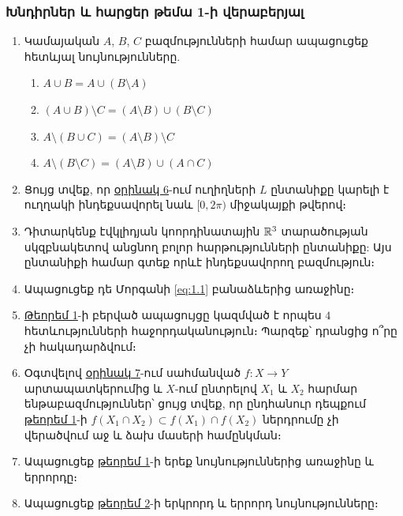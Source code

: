 \bigskip
\bigskip
\subsubsection*{Խնդիրներ և հարցեր թեմա 1-ի վերաբերյալ}

\begin{enumerate}[label=\thesection.\arabic*.]
\item  Կամայական $A$, $B$, $C$ բազմությունների համար ապացուցեք հետևյալ նույ\-նու\-թյուն\-ները.
\begin{enumerate}
    \item[ա)] $A \cup B = A \cup (B \setminus A)$
    \item[բ)] $(A \cup B) \setminus C = (A \setminus B)\cup(B \setminus C)$
    \item[գ)] $A \setminus(B \cup C)  = (A \setminus B) \setminus C$
    \item[դ)] $A \setminus (B \setminus C) = (A \setminus B) \cup (A \cap C)$
\end{enumerate}

\item  Ցույց տվեք, որ \hyperref[ch1ex6]{օրինակ 6}-ում ուղիղների $L$ ընտանիքը կարելի է ուղղակի ինդեքսավորել նաև $[0, 2\pi)$ միջակայքի թվերով։

\item  Դիտարկենք էվկլիդյան կոորդինատային $\mathbb{R}^3$ տարածության սկզբնակետով \linebreak անցնող բոլոր հարթությունների ընտանիքը: Այս ընտանիքի համար գտեք որևէ ինդեքսավորող բազմություն։

\item  Ապացուցեք դե Մորգանի \eqref{eq:1.1} բանաձևերից առաջինը։

\item  \hyperref[ch1thm1]{Թեորեմ 1}-ի բերված ապացույցը կազմված է որպես $4$ հետևությունների հա\-ջոր\-դա\-կա\-նու\-թյուն։ Պարզեք՝ դրանցից ո՞րը չի հակադարձվում։

\item  Օգտվելով \hyperref[ch1ex7]{օրինակ 7}-ում սահմանված $f: X \rightarrow Y$ արտապատկերումից և $X$-ում ընտրելով $X_1$ և $X_2$ հարմար ենթաբազմություններ՝ ցույց տվեք, որ ընդհանուր դեպքում \hyperref[ch1thm1]{թեորեմ 1}-ի $f(X_1 \cap X_2) \subset f(X_1) \cap f(X_2)$ ներդրումը չի վերածվում աջ և ձախ մասերի համընկման։

\item  Ապացուցեք \hyperref[ch1thm1]{թեորեմ 1}-ի երեք նույնություններից առաջինը և երրորդը։

\item  Ապացուցեք \hyperref[ch1thm2]{թեորեմ 2}-ի երկրորդ և երրորդ նույնությունները։


\end{enumerate}
